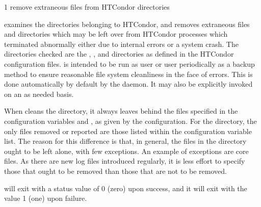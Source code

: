 \begin{ManPage}{\label{man-condor-preen}}{1}
{remove extraneous files from HTCondor directories}

\Synopsis {}

\Description 

 examines the directories belonging to HTCondor, 
and removes extraneous files and directories which may be left over from
HTCondor processes which terminated abnormally either due to internal errors or
a system crash. The directories checked are 
the , , and 
directories as defined in the HTCondor configuration files.  is
intended to be run as user  or user 
periodically as a backup
method to ensure reasonable file system cleanliness in the face of
errors. This is done automatically by default by the  daemon. 
It may also be explicitly invoked on an as needed basis.

When  cleans the  directory, it always leaves
behind the files specified in the configuration variables
 and ,
as given by the configuration.
For the  directory, the only files removed or reported are those
listed within the configuration variable  list.
The reason for this difference is that, in general,
the files in the  directory ought to be left alone,
with few exceptions.
An example of exceptions are core files.
As there are new log files introduced regularly,
it is less effort to specify those that ought to be removed
than those that are not to be removed.

\begin{Options}





\end{Options}

\ExitStatus

 will exit with a status value of 0 (zero) upon success,
and it will exit with the value 1 (one) upon failure.

\end{ManPage}
